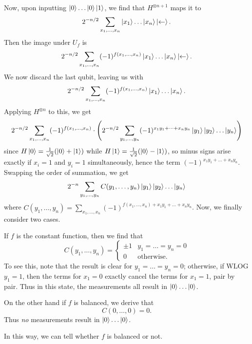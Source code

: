 \begin{problem}
\begin{sol}
		Now, upon inputting $\ket0 \dots \ket0 \ket1$, we find that $H^{\otimes n+1}$ maps it to
		\[ 2^{-n/2} \sum_{x_1, \dots, x_n} \ket{x_1} \dots \ket{x_n} \ket\leftarrow.  \]
		Then the image under $U_f$ is
		\[ 2^{-n/2} \sum_{x_1, \dots, x_n} (-1)^{f(x_1, \dots, x_n)} \ket{x_1} \dots \ket{x_n} \ket\leftarrow.  \]
		We now discard the last qubit, leaving us with
		\[ 2^{-n/2} \sum_{x_1, \dots, x_n} (-1)^{f(x_1, \dots, x_n)} \ket{x_1} \dots \ket{x_n}.  \]
		Applying $H^{\otimes n}$ to this, we get
		\[ 2^{-n/2} \sum_{x_1, \dots, x_n} (-1)^{f(x_1, \dots, x_n)}
			\cdot
			\left(
			2^{-n/2}
			\sum_{y_1, \dots, y_n}
			(-1)^{x_1 y_1 + \dots + x_n y_n}
			\ket{y_1} \ket{y_2} \dots \ket{y_n}
			\right)
		\]
		since $H\ket0 = \frac{1}{\sqrt2}(\ket0+\ket1)$
		while $H\ket1 = \frac{1}{\sqrt2}(\ket0-\ket1)$,
		so minus signs arise exactly if $x_i = 1$ and $y_i = 1$ simultaneously,
		hence the term $(-1)^{x_1 y_1 + \dots + x_n y_n}$.
		Swapping the order of summation, we get
		\[
			2^{-n}
			\sum_{y_1, \dots, y_n}
			C(y_1, \dots, y_n)
			\ket{y_1} \ket{y_2} \dots \ket{y_n}
		\]
		where $C(y_1, \dots, y_n)
		= \sum_{x_1, \dots, x_n} (-1)^{f(x_1, \dots, x_n)
			+x_1 y_1 + \dots + x_n y_n}$.
		Now, we finally consider two cases.
		\begin{itemize}
			\ii If $f$ is the constant function, then we find that
			\[
				C(y_1, \dots, y_n) =
				\begin{cases}
					\pm 1 &  y_1 = \dots = y_n = 0 \\
					0 & \text{otherwise}.
				\end{cases}
			\]
			To see this, note that the result is clear for $y_1 = \dots = y_n = 0$;
			otherwise, if WLOG $y_1 = 1$, then the terms for $x_1 = 0$ exactly cancel
			the terms for $x_1 = 1$, pair by pair.
			Thus in this state, the measurements all result in $\ket0 \dots \ket0$.

			\ii On the other hand if $f$ is balanced, we derive that
			\[ C(0, \dots, 0) = 0. \]
			Thus \emph{no} measurements result in $\ket 0 \dots \ket 0$.
		\end{itemize}
		In this way, we can tell whether $f$ is balanced or not.
	\end{sol}
\end{problem}

